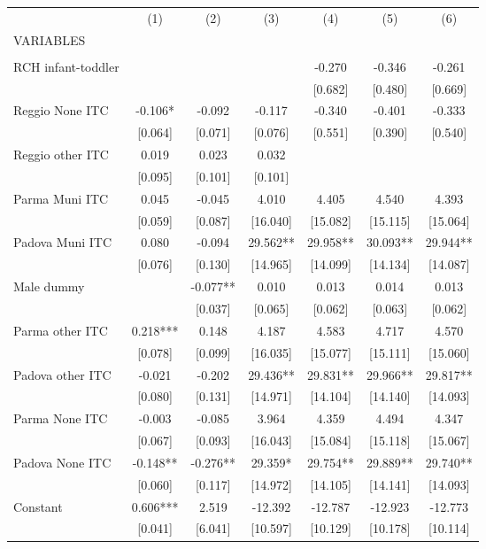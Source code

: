 \begin{tabular}{lcccccc} \hline
 & (1) & (2) & (3) & (4) & (5) & (6) \\
VARIABLES &  &  &  &  &  &  \\ \hline
 &  &  &  &  &  &  \\
RCH infant-toddler &  &  &  & -0.270 & -0.346 & -0.261 \\
 &  &  &  & [0.682] & [0.480] & [0.669] \\
Reggio None ITC & -0.106* & -0.092 & -0.117 & -0.340 & -0.401 & -0.333 \\
 & [0.064] & [0.071] & [0.076] & [0.551] & [0.390] & [0.540] \\
Reggio other ITC & 0.019 & 0.023 & 0.032 &  &  &  \\
 & [0.095] & [0.101] & [0.101] &  &  &  \\
Parma Muni ITC & 0.045 & -0.045 & 4.010 & 4.405 & 4.540 & 4.393 \\
 & [0.059] & [0.087] & [16.040] & [15.082] & [15.115] & [15.064] \\
Padova Muni ITC & 0.080 & -0.094 & 29.562** & 29.958** & 30.093** & 29.944** \\
 & [0.076] & [0.130] & [14.965] & [14.099] & [14.134] & [14.087] \\
Male dummy &  & -0.077** & 0.010 & 0.013 & 0.014 & 0.013 \\
 &  & [0.037] & [0.065] & [0.062] & [0.063] & [0.062] \\
Parma other ITC & 0.218*** & 0.148 & 4.187 & 4.583 & 4.717 & 4.570 \\
 & [0.078] & [0.099] & [16.035] & [15.077] & [15.111] & [15.060] \\
Padova other ITC & -0.021 & -0.202 & 29.436** & 29.831** & 29.966** & 29.817** \\
 & [0.080] & [0.131] & [14.971] & [14.104] & [14.140] & [14.093] \\
Parma None ITC & -0.003 & -0.085 & 3.964 & 4.359 & 4.494 & 4.347 \\
 & [0.067] & [0.093] & [16.043] & [15.084] & [15.118] & [15.067] \\
Padova None ITC & -0.148** & -0.276** & 29.359* & 29.754** & 29.889** & 29.740** \\
 & [0.060] & [0.117] & [14.972] & [14.105] & [14.141] & [14.093] \\
Constant & 0.606*** & 2.519 & -12.392 & -12.787 & -12.923 & -12.773 \\
 & [0.041] & [6.041] & [10.597] & [10.129] & [10.178] & [10.114] \\

\end{tabular}
